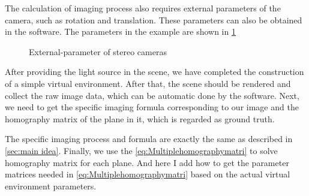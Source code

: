 The calculation of imaging process also requires external parameters of the camera, such as rotation and translation. These parameters can also be obtained in the software. The parameters in the example are shown in \cref{fig:External-parameter of Stereo Cameras}
\begin{figure}[htbp]
	\centering
	 \quad
	\caption{External-parameter of stereo cameras}
	\label{fig:External-parameter of Stereo Cameras}
\end{figure}

After providing the light source in the scene, we have completed the construction of a simple virtual environment. After that, the scene should be rendered and collect the raw image data, which can be automatic done by the software. Next, we need to get the specific imaging formula corresponding to our image and the homography matrix of the plane in it, which is regarded as ground truth.

The specific imaging process and formula are exactly the same as described in \cref{sec:main idea}. Finally, we use the \cref{eq:Multiplehomographymatri} to solve homography matrix for each plane. And here I add how to get the parameter matrices needed in \cref{eq:Multiplehomographymatri} based on the actual virtual environment parameters.

